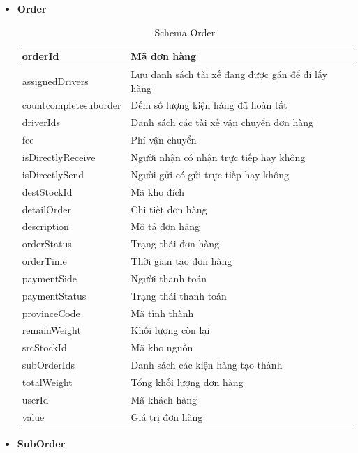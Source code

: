 	\begin{itemize}
		\item \textbf{Order}
		
		\begin{table}[!htp]
			\centering\begin{tabular}{|l|m{30em}|}
				\hline 
				orderId & Mã đơn hàng\\
				\hline 
				assignedDrivers & Lưu danh sách tài xế đang được gán để đi lấy hàng \\ 
				\hline
				countcompletesuborder & Đếm số lượng kiện hàng đã hoàn tất \\
				\hline 
				driverIds & Danh sách các tài xế vận chuyển đơn hàng \\
				\hline
				fee & Phí vận chuyển \\
				\hline
				isDirectlyReceive & Người nhận có nhận trực tiếp hay không \\
				\hline
				isDirectlySend & Người gửi có gửi trực tiếp hay không \\
				\hline
				destStockId & Mã kho đích \\
				\hline
				detailOrder & Chi tiết đơn hàng \\
				\hline
				description & Mô tả đơn hàng \\
				\hline
				orderStatus & Trạng thái đơn hàng \\
				\hline
				orderTime & Thời gian tạo đơn hàng \\
				\hline
				paymentSide & Người thanh toán \\
				\hline
				paymentStatus & Trạng thái thanh toán \\
				\hline
				provinceCode & Mã tỉnh thành \\
				\hline
				remainWeight & Khối lượng còn lại \\
				\hline
				srcStockId & Mã kho nguồn \\
				\hline
				subOrderIds & Danh sách các kiện hàng tạo thành \\
				\hline
				totalWeight & Tổng khối lượng đơn hàng \\
				\hline
				userId & Mã khách hàng \\
				\hline
				value & Giá trị đơn hàng \\
				\hline
			\end{tabular}
			\caption{Schema Order}
		\end{table}
	
	\newpage
	
		\item \textbf{SubOrder}
		

\end{itemize}
